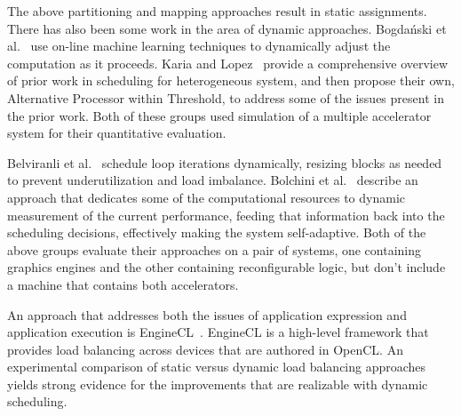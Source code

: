 The above partitioning and mapping approaches result in static assignments.
There has also been some work in the area of dynamic approaches.
Bogda\'{n}ski et al.~\cite{blby11} use on-line machine learning techniques to
dynamically adjust the computation as it proceeds.
Karia and Lopez~\cite{kl17} provide a comprehensive overview of prior
work in scheduling for heterogeneous system, and then propose their own,
Alternative Processor within Threshold, to address some of the issues
present in the prior work.
Both of these groups used simulation
of a multiple accelerator system for their quantitative evaluation.

Belviranli et al.~\cite{bbg13} schedule loop iterations dynamically, resizing
blocks as needed to prevent underutilization and load imbalance.
Bolchini et al.~\cite{bdm+15} describe an approach that dedicates some of the
computational resources to dynamic measurement of the current performance,
feeding that information back into the scheduling decisions, effectively
making the system self-adaptive.
Both of the above groups
evaluate their approaches on a pair of systems, one containing graphics
engines and the other containing reconfigurable logic, but don't include
a machine that contains both accelerators.

An approach that addresses both the issues of application expression
and application execution is EngineCL~\cite{dng+19}.  EngineCL is a
high-level framework that provides load balancing across devices that
are authored in OpenCL.  An experimental comparison of static versus
dynamic load balancing approaches yields strong evidence for the
improvements that are realizable with dynamic scheduling.

